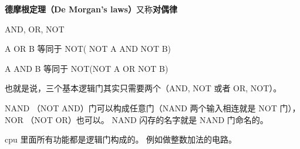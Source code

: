 
\begin{issues}
\issueDraft
\end{issues}


\textbf{德摩根定理（De Morgan's laws）}又称\textbf{对偶律}

AND, OR, NOT

A OR B 等同于 NOT( NOT A AND NOT B)

A AND B 等同于 NOT(NOT A OR NOT B)

也就是说，三个基本逻辑门其实只需要两个（AND, NOT 或者 OR, NOT）。

NAND （NOT AND）门可以构成任意门（NAND 两个输入相连就是 NOT 门）， NOR （NOT OR）也可以。 NAND 闪存的名字就是 NAND 门命名的。

cpu 里面所有功能都是逻辑门构成的。 例如做整数加法的电路。
